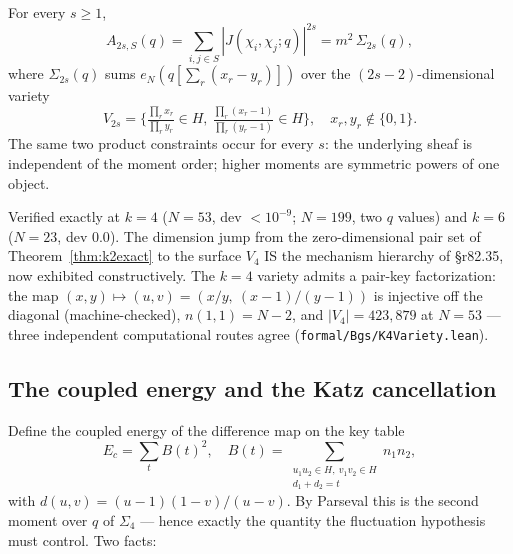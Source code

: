 \begin{theorem}
\label{thm:evenk}
For every $s \ge 1$,
\[
  A_{2s,S}(q) = \sum_{i,j \in S} |J(\chi_i,\chi_j;q)|^{2s}
             = m^2 \, \Sigma_{2s}(q),
\]
where $\Sigma_{2s}(q)$ sums $e_N(q[\textstyle\sum_r (x_r - y_r)])$ over
the $(2s{-}2)$-dimensional variety
\[
  V_{2s} = \Big\{ \tfrac{\prod_r x_r}{\prod_r y_r} \in H,\
  \tfrac{\prod_r (x_r{-}1)}{\prod_r (y_r{-}1)} \in H \Big\},
  \quad x_r, y_r \notin \{0,1\}.
\]
The same two product constraints occur for every $s$: the underlying
sheaf is independent of the moment order; higher moments are symmetric
powers of one object.
\end{theorem}

Verified exactly at $k=4$ ($N = 53$, dev $< 10^{-9}$; $N = 199$, two
$q$ values) and $k=6$ ($N = 23$, dev $0.0$).  The dimension jump from
the zero-dimensional pair set of Theorem~\ref{thm:k2exact} to the
surface $V_4$ IS the mechanism hierarchy of \S r82.35, now exhibited
constructively.  The $k=4$ variety admits a pair-key factorization:
the map $(x,y) \mapsto (u,v) = (x/y,\ (x{-}1)/(y{-}1))$ is injective
off the diagonal (machine-checked), $n(1,1) = N{-}2$, and
$|V_4| = 423{,}879$ at $N = 53$ — three independent computational
routes agree (\texttt{formal/Bgs/K4Variety.lean}).

\subsection{The coupled energy and the Katz cancellation}

Define the coupled energy of the difference map on the key table
\[
  E_c = \sum_t B(t)^2, \quad
  B(t) = \sum_{\substack{u_1 u_2 \in H,\ v_1 v_2 \in H \\ d_1 + d_2 = t}}
        n_1 n_2,
\]
with $d(u,v) = (u{-}1)(1{-}v)/(u{-}v)$.  By Parseval this is the second
moment over $q$ of $\Sigma_4$ — hence exactly the quantity the
fluctuation hypothesis must control.  Two facts:

